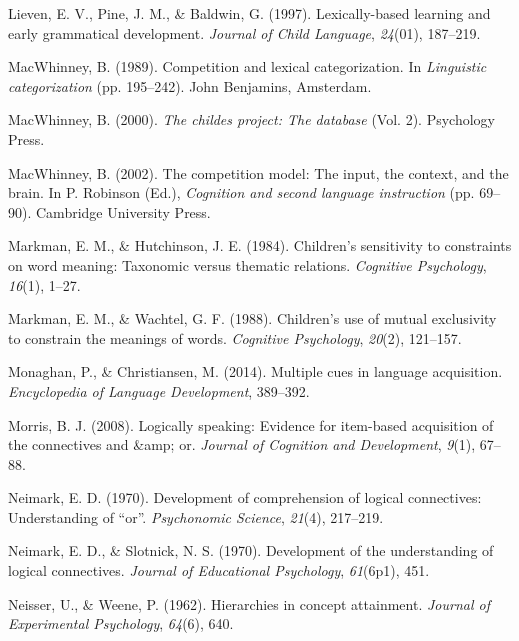 \documentclass[oneside]{report}
\theoremstyle{definition}
\theoremstyle{definition}
\theoremstyle{definition}
\theoremstyle{remark}
\begin{document}
\hypertarget{ref-lieven1997lexically}{}
Lieven, E. V., Pine, J. M., \& Baldwin, G. (1997). Lexically-based
learning and early grammatical development. \emph{Journal of Child
Language}, \emph{24}(01), 187--219.

\hypertarget{ref-macwhinney1989competition}{}
MacWhinney, B. (1989). Competition and lexical categorization. In
\emph{Linguistic categorization} (pp. 195--242). John Benjamins,
Amsterdam.

\hypertarget{ref-macwhinney2000childes}{}
MacWhinney, B. (2000). \emph{The childes project: The database} (Vol.
2). Psychology Press.

\hypertarget{ref-macwhinney2002competition}{}
MacWhinney, B. (2002). The competition model: The input, the context,
and the brain. In P. Robinson (Ed.), \emph{Cognition and second language
instruction} (pp. 69--90). Cambridge University Press.

\hypertarget{ref-markman1984children}{}
Markman, E. M., \& Hutchinson, J. E. (1984). Children's sensitivity to
constraints on word meaning: Taxonomic versus thematic relations.
\emph{Cognitive Psychology}, \emph{16}(1), 1--27.

\hypertarget{ref-markman1988children}{}
Markman, E. M., \& Wachtel, G. F. (1988). Children's use of mutual
exclusivity to constrain the meanings of words. \emph{Cognitive
Psychology}, \emph{20}(2), 121--157.

\hypertarget{ref-monaghan2014multiple}{}
Monaghan, P., \& Christiansen, M. (2014). Multiple cues in language
acquisition. \emph{Encyclopedia of Language Development}, 389--392.

\hypertarget{ref-morris2008logically}{}
Morris, B. J. (2008). Logically speaking: Evidence for item-based
acquisition of the connectives and \&amp; or. \emph{Journal of Cognition
and Development}, \emph{9}(1), 67--88.

\hypertarget{ref-neimark1970}{}
Neimark, E. D. (1970). Development of comprehension of logical
connectives: Understanding of ``or''. \emph{Psychonomic Science},
\emph{21}(4), 217--219.

\hypertarget{ref-neimarkSlotnick1970}{}
Neimark, E. D., \& Slotnick, N. S. (1970). Development of the
understanding of logical connectives. \emph{Journal of Educational
Psychology}, \emph{61}(6p1), 451.

\hypertarget{ref-neisser1962hierarchies}{}
Neisser, U., \& Weene, P. (1962). Hierarchies in concept attainment.
\emph{Journal of Experimental Psychology}, \emph{64}(6), 640.
\end{document}
